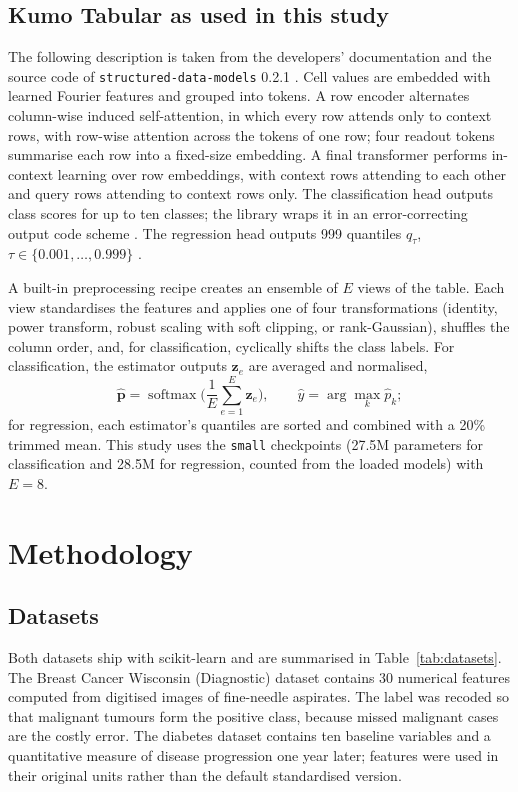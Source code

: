 \documentclass{ieeeaccess}
\begin{document}
\subsection{Kumo Tabular as used in this study}
The following description is taken from the developers' documentation \cite{nvidia_kumo_blog} and the source code of \texttt{structured-data-models} 0.2.1 \cite{nvidia_sdm}. Cell values are embedded with learned Fourier features and grouped into tokens. A row encoder alternates column-wise induced self-attention, in which every row attends only to context rows, with row-wise attention across the tokens of one row; four readout tokens summarise each row into a fixed-size embedding. A final transformer performs in-context learning over row embeddings, with context rows attending to each other and query rows attending to context rows only. The classification head outputs class scores for up to ten classes; the library wraps it in an error-correcting output code scheme \cite{dietterich1995ecoc}. The regression head outputs 999 quantiles $q_{\tau}$, $\tau\in\{0.001,\dots,0.999\}$ \cite{koenker1978quantiles}.

A built-in preprocessing recipe creates an ensemble of $E$ views of the table. Each view standardises the features and applies one of four transformations (identity, power transform, robust scaling with soft clipping, or rank-Gaussian), shuffles the column order, and, for classification, cyclically shifts the class labels. For classification, the estimator outputs $\mathbf{z}_e$ are averaged and normalised,
\begin{equation}
\hat{\mathbf{p}}=\operatorname{softmax}\Big(\frac{1}{E}\sum_{e=1}^{E}\mathbf{z}_e\Big),\qquad \hat{y}=\arg\max_{k}\hat{p}_k ;
\label{eq:ensemble}
\end{equation}
for regression, each estimator's quantiles are sorted and combined with a 20\% trimmed mean. This study uses the \texttt{small} checkpoints (27.5M parameters for classification and 28.5M for regression, counted from the loaded models) with $E=8$.

\section{Methodology}

\subsection{Datasets}
Both datasets ship with scikit-learn and are summarised in Table~\ref{tab:datasets}. The Breast Cancer Wisconsin (Diagnostic) dataset \cite{street1993nuclear} contains 30 numerical features computed from digitised images of fine-needle aspirates. The label was recoded so that malignant tumours form the positive class, because missed malignant cases are the costly error. The diabetes dataset \cite{efron2004lars} contains ten baseline variables and a quantitative measure of disease progression one year later; features were used in their original units rather than the default standardised version.
\end{document}
